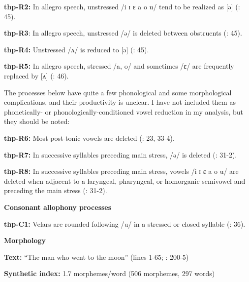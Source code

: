 \textbf{thp-R2:} In allegro speech, unstressed /i ɪ ɛ a o u/ tend to be realized as [ə] (\citealt{ThompsonThompson1992}: 45).



\textbf{thp-R3}: In allegro speech, unstressed /ə/ is deleted between obstruents (\citealt{ThompsonThompson1992}: 45).



\textbf{thp-R4:} Unstressed /ʌ/ is reduced to [ə] (\citealt{ThompsonThompson1992}: 45).



\textbf{thp-R5:} In allegro speech, stressed /a, o/ and sometimes /ɛ/ are frequently replaced by [ʌ] (\citealt{ThompsonThompson1992}: 46).



The processes below have quite a few phonological and some morphological complications, and their productivity is unclear. I have not included them as phonetically- or phonologically-conditioned vowel reduction in my analysis, but they should be noted:



\textbf{thp-R6:} Most post-tonic vowels are deleted (\citealt{ThompsonThompson1992}: 23, 33-4).



\textbf{thp-R7:} In successive syllables preceding main stress, /ə/ is deleted (\citealt{ThompsonThompson1992}: 31-2).



\textbf{thp-R8:} In successive syllables preceding main stress, vowels /i ɪ ɛ a o u/ are deleted when adjacent to a laryngeal, pharyngeal, or homorganic semivowel and preceding the main stress (\citealt{ThompsonThompson1992}: 31-2).



\textbf{Consonant allophony processes}



\textbf{thp-C1:} Velars are rounded following /u/ in a stressed or closed syllable (\citealt{ThompsonThompson1992}: 36).



\textbf{Morphology}



\textbf{Text:} “The man who went to the moon” (lines 1-65; \citealt{ThompsonThompson1992}: 200-5)



\textbf{Synthetic index:} 1.7 morphemes/word (506 morphemes, 297 words)



